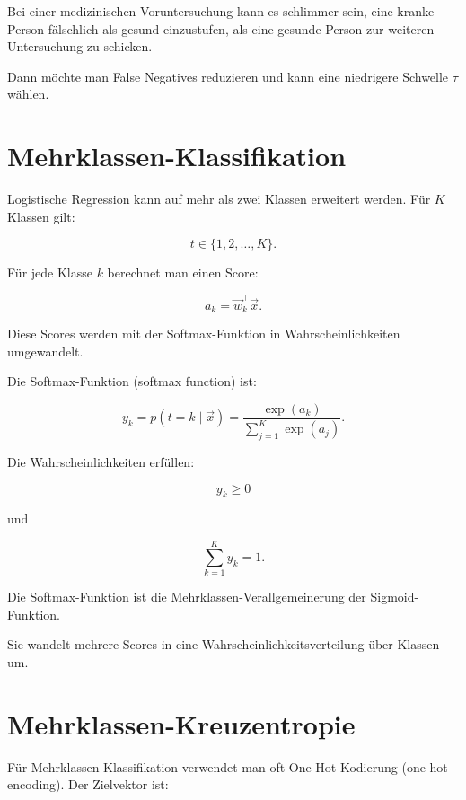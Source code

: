 \begin{examplebox}
Bei einer medizinischen Voruntersuchung kann es schlimmer sein, eine kranke Person fälschlich als gesund einzustufen, als eine gesunde Person zur weiteren Untersuchung zu schicken.

Dann möchte man False Negatives reduzieren und kann eine niedrigere Schwelle \(\tau\) wählen.
\end{examplebox}

\section{Mehrklassen-Klassifikation}

Logistische Regression kann auf mehr als zwei Klassen erweitert werden.
Für \(K\) Klassen gilt:

\[
    t \in \{1,2,\dots,K\}.
\]

Für jede Klasse \(k\) berechnet man einen Score:

\[
    a_k
    =
    \vec{w}_k^{\top}\vec{x}.
\]

Diese Scores werden mit der Softmax-Funktion in Wahrscheinlichkeiten umgewandelt.

\begin{definitionbox}
Die Softmax-Funktion (softmax function) ist:

\[
    y_k
    =
    p(t=k\mid\vec{x})
    =
    \frac{
        \exp(a_k)
    }{
        \sum_{j=1}^{K}
        \exp(a_j)
    }.
\]
\end{definitionbox}

Die Wahrscheinlichkeiten erfüllen:

\[
    y_k \geq 0
\]

und

\[
    \sum_{k=1}^{K} y_k = 1.
\]

\begin{conceptbox}
Die Softmax-Funktion ist die Mehrklassen-Verallgemeinerung der Sigmoid-Funktion.

Sie wandelt mehrere Scores in eine Wahrscheinlichkeitsverteilung über Klassen um.
\end{conceptbox}

\section{Mehrklassen-Kreuzentropie}

Für Mehrklassen-Klassifikation verwendet man oft One-Hot-Kodierung (one-hot encoding).
Der Zielvektor ist:

